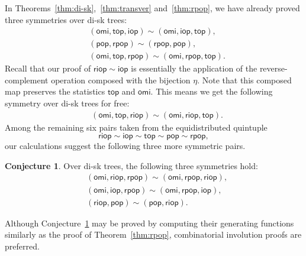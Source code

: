 \documentclass[12pt]{amsart}
\numberwithin{equation}{section}
\theoremstyle{plain}
\theoremstyle{definition}
\newtheorem{conj}[theorem]{Conjecture}
\def\iop{\mathsf{iop}}
\def\top{\mathsf{top}}
\def\riop{\mathsf{riop}}
\def\pop{\mathsf{pop}}
\def\rpop{\mathsf{rpop}}
\def\omi{\mathsf{omi}}
\begin{document}
In Theorems~\ref{thm:di-sk},~\ref{thm:transver} and~\ref{thm:rpop}, we have already proved three symmetries over di-sk trees: 
\begin{align*}
&(\omi,\top,\iop)\sim(\omi,\iop,\top),\\
&(\pop,\rpop)\sim(\rpop,\pop),\\
& (\omi,\top,\rpop)\sim(\omi,\rpop,\top).
\end{align*}
Recall that our proof of $\riop\sim\iop$ is essentially the application of the reverse-complement operation composed with the bijection $\eta$. Note that this composed map preserves the statistics $\top$ and $\omi$. This means we get the following symmetry over di-sk trees for free:
\begin{align*}
&(\omi,\top,\riop)\sim(\omi,\riop,\top).
\end{align*} 
Among the remaining six pairs taken from the equidistributed quintuple $$\riop\sim\iop\sim\top\sim\pop\sim\rpop,$$ our calculations suggest the following three more symmetric pairs. 
\begin{conj}\label{conj:sym}
Over di-sk trees, the following three symmetries hold:
\begin{align*}
&(\omi,\riop,\rpop)\sim(\omi,\rpop,\riop),\\
&(\omi,\iop,\rpop)\sim(\omi,\rpop,\iop),\\
& (\riop,\pop)\sim(\pop,\riop).
\end{align*}
\end{conj}
Although Conjecture~\ref{conj:sym} may be proved by computing their generating functions similarly as the proof of Theorem~\ref{thm:rpop},  combinatorial involution proofs are preferred. 

\end{document}

